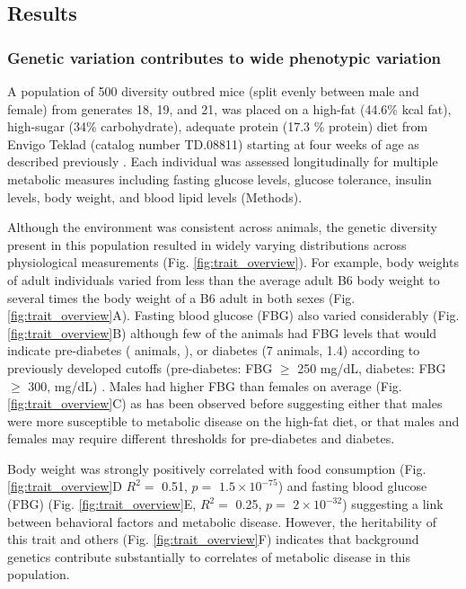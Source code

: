 \documentclass[
]{article}
\begin{document}
\subsection{Results}\label{results}

\subsubsection{Genetic variation contributes to wide phenotypic
variation}\label{genetic-variation-contributes-to-wide-phenotypic-variation}

A population of 500 diversity outbred mice (split evenly between male
and female) from generates 18, 19, and 21, was placed on a high-fat
(44.6\% kcal fat), high-sugar (34\% carbohydrate), adequate protein
(17.3 \% protein) diet from Envigo Teklad (catalog number TD.08811)
starting at four weeks of age as described previously
\cite{pmid29567659}. Each individual was assessed longitudinally for
multiple metabolic measures including fasting glucose levels, glucose
tolerance, insulin levels, body weight, and blood lipid levels
(Methods).

Although the environment was consistent across animals, the genetic
diversity present in this population resulted in widely varying
distributions across physiological measurements (Fig.
\ref{fig:trait_overview}). For example, body weights of adult
individuals varied from less than the average adult B6 body weight to
several times the body weight of a B6 adult in both sexes (Fig.
\ref{fig:trait_overview}A). Fasting blood glucose (FBG) also varied
considerably (Fig. \ref{fig:trait_overview}B) although few of the
animals had FBG levels that would indicate pre-diabetes ( animals, ), or
diabetes (7 animals, 1.4) according to previously developed cutoffs
(pre-diabetes: FBG \(\geq\) 250 mg/dL, diabetes: FBG \(\geq\) 300,
mg/dL) \cite{pmid17018838}. Males had higher FBG than females on average
(Fig. \ref{fig:trait_overview}C) as has been observed before suggesting
either that males were more susceptible to metabolic disease on the
high-fat diet, or that males and females may require different
thresholds for pre-diabetes and diabetes.

Body weight was strongly positively correlated with food consumption
(Fig. \ref{fig:trait_overview}D \(R^2 =\) 0.51, \(p=\)
\ensuremath{1.5\times 10^{-75}}) and fasting blood glucose (FBG) (Fig.
\ref{fig:trait_overview}E, \(R^2=\) 0.25, \(p =\)
\ensuremath{2\times 10^{-32}}) suggesting a link between behavioral
factors and metabolic disease. However, the heritability of this trait
and others (Fig. \ref{fig:trait_overview}F) indicates that background
genetics contribute substantially to correlates of metabolic disease in
this population.
\end{document}
